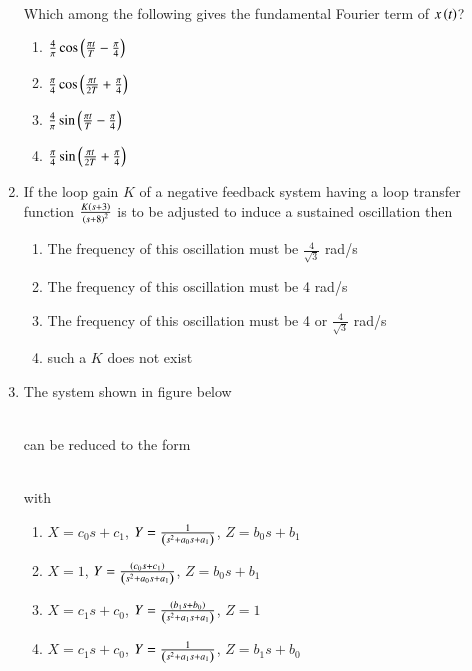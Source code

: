 \documentclass[journal]{IEEEtran}
\begin{document}
\begin{enumerate}
\begin{align*}
\end{align*}
Which among the following gives the fundamental Fourier term of $x\left(t\right)$? 
\begin{enumerate}
    \item $\frac{4}{\pi}\cos\left(\frac{\pi t}{T} - \frac{\pi}{4}\right)$
    \item $\frac{\pi}{4}\cos\left(\frac{\pi t}{2T} + \frac{\pi}{4}\right)$
    \item $\frac{4}{\pi}\sin\left(\frac{\pi t}{T} - \frac{\pi}{4}\right)$
    \item $\frac{\pi}{4}\sin\left(\frac{\pi t}{2T} + \frac{\pi}{4}\right)$ \\
\end{enumerate}
 \item If the loop gain $K$ of a negative feedback system having a loop transfer function $\frac{K\left(s+3\right)}{\left(s+8\right)^2}$ is to be adjusted to induce a sustained oscillation then
 \begin{enumerate}
     \item The frequency of this oscillation must be $\frac{4}{\sqrt{3}}$ rad/s
     \item The frequency of this oscillation must be 4 rad/s
     \item The frequency of this oscillation must be 4 or $\frac{4}{\sqrt{3}}$ rad/s
     \item such a $K$ does not exist \\
 \end{enumerate}
\item The system shown in figure below
\begin{figure}[!ht]
\centering
\resizebox{0.5\textwidth}{!}{%

}%
\end{figure}\\
can be reduced to the form
\begin{figure}[!ht]
\centering
\resizebox{0.5\textwidth}{!}{%

}%
\end{figure}\\
with
\begin{enumerate}
    \item $X = c_0s + c_1$, $Y = \frac{1}{\left(s^2 + a_0s + a_1\right)}$, $Z = b_0s + b_1$
    \item $X = 1$, $Y = \frac{\left(c_0s + c_1\right)}{\left(s^2 + a_0s + a_1\right)}$, $Z = b_0s + b_1$
    \item $X = c_1s + c_0$, $Y = \frac{\left(b_1s + b_0\right)}{\left(s^2 + a_1s + a_1\right)}$, $Z = 1$
    \item $X = c_1s + c_0$, $Y = \frac{1}{\left(s^2 + a_1s + a_1\right)}$, $Z = b_1s + b_0$ \\

\end{enumerate}
\end{enumerate}
\end{document}
